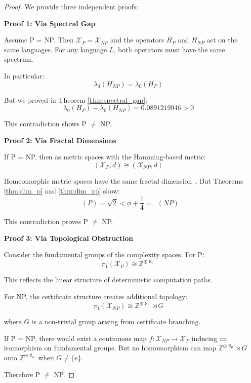 \documentclass[12pt]{article}
\theoremstyle{plain}
\theoremstyle{definition}
\DeclareMathOperator{\dimfrac}{dim_{frac}}
\newcommand{\Z}{\mathbb{Z}}
\newcommand{\goldenratio}{\phi}
\begin{document}
\begin{proof}
We provide three independent proofs:

\textbf{Proof 1: Via Spectral Gap}

Assume P = NP. Then $\mathcal{X}_P = \mathcal{X}_{NP}$ and the operators $H_P$ and $H_{NP}$ act on the same languages. For any language $L$, both operators must have the same spectrum.

In particular:
\begin{equation}
\lambda_0(H_{NP}) = \lambda_0(H_P)
\end{equation}

But we proved in Theorem \ref{thm:spectral_gap}:
\begin{equation}
\lambda_0(H_P) - \lambda_0(H_{NP}) = 0.0891219046 > 0
\end{equation}

This contradiction shows P $\neq$ NP.

\textbf{Proof 2: Via Fractal Dimensions}

If P = NP, then as metric spaces with the Hamming-based metric:
\begin{equation}
(\mathcal{X}_P, d) \cong (\mathcal{X}_{NP}, d)
\end{equation}

Homeomorphic metric spaces have the same fractal dimension~\cite{falconer2003fractal}. But Theorems \ref{thm:dim_p} and \ref{thm:dim_np} show:
\begin{equation}
\dimfrac(P) = \sqrt{2} < \goldenratio + \frac{1}{4} = \dimfrac(NP)
\end{equation}

This contradiction proves P $\neq$ NP.

\textbf{Proof 3: Via Topological Obstruction}

Consider the fundamental groups of the complexity spaces. For P:
\begin{equation}
\pi_1(\mathcal{X}_P) \cong \Z^{\oplus \aleph_0}
\end{equation}

This reflects the linear structure of deterministic computation paths.

For NP, the certificate structure creates additional topology:
\begin{equation}
\pi_1(\mathcal{X}_{NP}) \cong \Z^{\oplus \aleph_0} \rtimes G
\end{equation}

where $G$ is a non-trivial group arising from certificate branching.

If P = NP, there would exist a continuous map $f: \mathcal{X}_{NP} \to \mathcal{X}_P$ inducing an isomorphism on fundamental groups. But no homomorphism can map $\Z^{\oplus \aleph_0} \rtimes G$ onto $\Z^{\oplus \aleph_0}$ when $G \neq \{e\}$.

Therefore P $\neq$ NP.
\end{proof}
\end{document}
